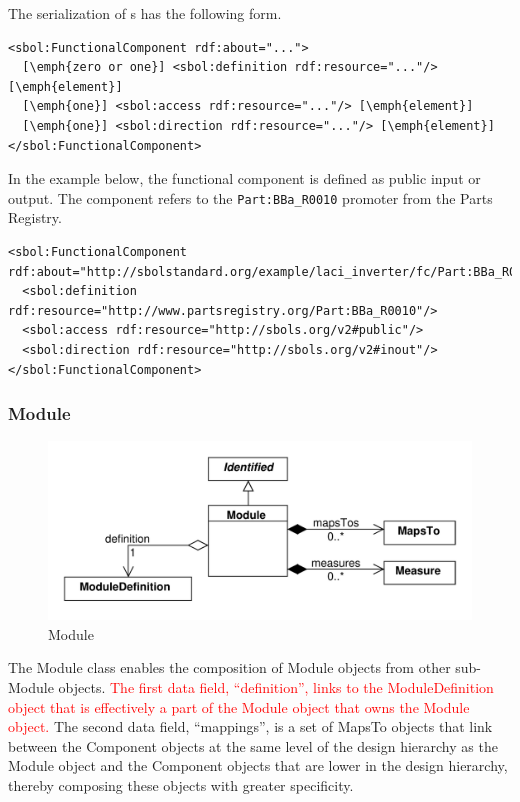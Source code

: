 The serialization of s has the following form.
\begin{lstlisting}
<sbol:FunctionalComponent rdf:about="...">
  [\emph{zero or one}] <sbol:definition rdf:resource="..."/> [\emph{element}]
  [\emph{one}] <sbol:access rdf:resource="..."/> [\emph{element}]
  [\emph{one}] <sbol:direction rdf:resource="..."/> [\emph{element}]
</sbol:FunctionalComponent>
\end{lstlisting}

In the example below, the functional component is defined as public input or output. The component refers to the \texttt{Part:BBa\_R0010} promoter from the Parts Registry.
\begin{lstlisting}
<sbol:FunctionalComponent rdf:about="http://sbolstandard.org/example/laci_inverter/fc/Part:BBa_R0010">
  <sbol:definition rdf:resource="http://www.partsregistry.org/Part:BBa_R0010"/>
  <sbol:access rdf:resource="http://sbols.org/v2#public"/>
  <sbol:direction rdf:resource="http://sbols.org/v2#inout"/>
</sbol:FunctionalComponent>
\end{lstlisting}

\subsubsection{Module}
\label{sec:Module}

\begin{figure}[ht]
\begin{center}
\includegraphics[scale=0.6]{uml/module}
\caption[]{Module}
\label{uml:module}
\end{center}
\end{figure}

The Module class enables the composition of Module objects from other sub-Module objects. \textcolor{red}{The first data field, ``definition'', links to the ModuleDefinition object that is effectively a part of the Module object that owns the Module object.} The second data field, ``mappings'', is a set of MapsTo objects that link between the Component objects at the same level of the design hierarchy as the Module object and the Component objects that are lower in the design hierarchy, thereby composing these objects with greater specificity.


